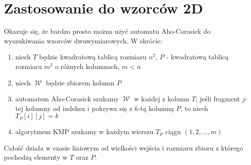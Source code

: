 \documentclass{article}
\DeclareMathOperator{\W}{\mathcal{W}}
\begin{document}
\section{Zastosowanie do wzorców 2D}
Okazuje się, że bardzo prosto można użyć automatu Aho-Corasick do wyszukiwania wzorców dwuwymiarowych. W skrócie:
\begin{enumerate}
    \item niech $T$ będzie kwadratową tablicą rozmiaru $n^2$, $P$ - kwadratową tablicą rozmiaru $m^2$ o różnych kolumnach, $m < n$
    \item niech $\W$ będzie zbiorem kolumn $P$
    \item automatem Aho-Corasick szukamy $\W$ w każdej z kolumn $T$; jeśli fragment $j$-tej kolumny od indeksu $i$ pokrywa się z $k$-tą kolumną $P$, to niech $T_P[i][j]=k$
    \item algorytmem KMP szukamy w każdym wierszu $T_P$ ciągu $(1,2,...,m)$
\end{enumerate}
Całość działa w czasie liniowym od wielkości wejścia i rozmiaru zbioru z którego pochodzą elementy w $T$ oraz $P$.
\end{document}
